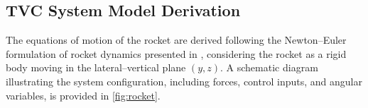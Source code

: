 \documentclass[10pt,twocolumn,twoside]{IEEEtran}
\begin{document}
\subsection{TVC System Model Derivation}
The equations of motion of the rocket are derived following the Newton--Euler formulation of rocket dynamics presented in \cite{Wie1998}, considering the rocket as a rigid body moving in the lateral--vertical plane $(y,z)$. A schematic diagram illustrating the system configuration, including forces, control inputs, and angular variables, is provided in \autoref{fig:rocket}.
\begin{figure}[]
    \centering
\end{figure}
\end{document}

